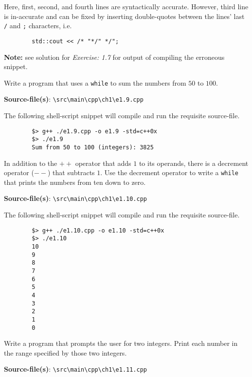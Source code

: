 \documentclass[12pt, a4paper]{article}
\begin{document}
    \noindent Here, first, second, and fourth lines are syntactically accurate.
    However, third line is in-accurate and can be fixed by inserting double-quotes between the lines' last \texttt{/} and \texttt{;} characters, i.e.
    \begin{verbatim}
        std::cout << /* "*/" */";
    \end{verbatim}

    \noindent\textbf{Note:} see solution for \textit{Exercise: 1.7} for output of compiling the erroneous snippet.

    \bigskip
    \begin{tcolorbox}[title={Exercise: 1.9}]
        Write a program that uses a \texttt{while} to sum the numbers from $50$ to $100$.
    \end{tcolorbox}
    \noindent\textbf{Source-file(s)}: \texttt{\textbackslash src\textbackslash main\textbackslash cpp\textbackslash ch1\textbackslash e1.9.cpp}

    \noindent The following shell-script snippet will compile and run the requisite source-file.
    \begin{verbatim}
        $> g++ ./e1.9.cpp -o e1.9 -std=c++0x
        $> ./e1.9
        Sum from 50 to 100 (integers): 3825
    \end{verbatim}

    \bigskip
    \begin{tcolorbox}[title={Exercise: 1.10}]
        In addition to the $++$ operator that adds $1$ to its operands, there is a decrement operator ($--$) that subtracts $1$.
        Use the decrement operator to write a \texttt{while} that prints the numbers from ten down to zero.
    \end{tcolorbox}
    \noindent\textbf{Source-file(s)}: \texttt{\textbackslash src\textbackslash main\textbackslash cpp\textbackslash ch1\textbackslash e1.10.cpp}

    \noindent The following shell-script snippet will compile and run the requisite source-file.
    \begin{verbatim}
        $> g++ ./e1.10.cpp -o e1.10 -std=c++0x
        $> ./e1.10
        10
        9
        8
        7
        6
        5
        4
        3
        2
        1
        0
    \end{verbatim}

    \bigskip
    \begin{tcolorbox}[title={Exercise: 1.11}]
        Write a program that prompts the user for two integers.
        Print each number in the range specified by those two integers.
    \end{tcolorbox}
    \noindent\textbf{Source-file(s)}: \texttt{\textbackslash src\textbackslash main\textbackslash cpp\textbackslash ch1\textbackslash e1.11.cpp}
\end{document}
